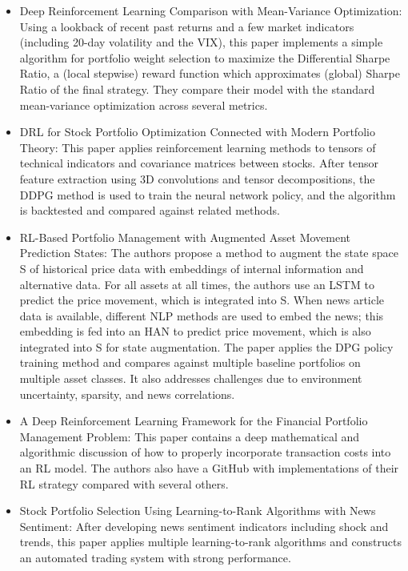\begin{itemize}

\item \cite{drl_mvo} Deep Reinforcement Learning Comparison with Mean-Variance Optimization: 
Using a lookback of recent past returns and a few market indicators 
(including 20-day volatility and the VIX), this paper implements a simple 
algorithm for portfolio weight selection to maximize the Differential Sharpe Ratio, 
a (local stepwise) reward function which approximates (global) Sharpe Ratio of the 
final strategy. They compare their model with the standard mean-variance 
optimization across several metrics.

\item \cite{drl_modern_portfolio_theory} DRL for Stock Portfolio Optimization Connected with Modern 
Portfolio Theory: This paper applies reinforcement learning methods to 
tensors of technical indicators and covariance matrices between stocks. 
After tensor feature extraction using 3D convolutions and tensor decompositions, 
the DDPG method is used to train the neural network policy, and the algorithm 
is backtested and compared against related methods.
 
\item \cite{rl_augmented_states} RL-Based Portfolio Management with Augmented Asset Movement Prediction 
States: The authors propose a method to augment the state space S of historical 
price data with embeddings of internal information and alternative data. 
For all assets at all times, the authors use an LSTM to predict the price movement,
which is integrated into S. When news article data is available, different NLP methods 
are used to embed the news; this embedding is fed into an HAN to predict price 
movement, which is also integrated into S for state augmentation. The paper applies 
the DPG policy training method and compares against multiple baseline portfolios on 
multiple asset classes. It also addresses challenges due to environment uncertainty, 
sparsity, and news correlations.

\item \cite{drl_framework} A Deep Reinforcement Learning Framework for the Financial Portfolio Management Problem: 
This paper contains a deep mathematical and algorithmic discussion of how to properly incorporate 
transaction costs into an RL model. The authors also have a GitHub with implementations of their 
RL strategy compared with several others.

\item \cite{learn_to_rank} Stock Portfolio Selection Using Learning-to-Rank Algorithms with News Sentiment: 
After developing news sentiment indicators including shock and trends, this paper applies 
multiple learning-to-rank algorithms and constructs an automated trading system with strong performance.


\end{itemize}
